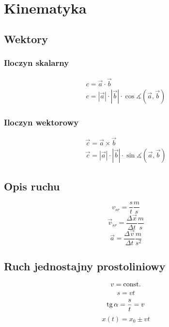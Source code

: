 \chapter{Kinematyka}
  \section{Wektory}
    \subsection{Iloczyn skalarny}
      \begin{gather}
        c = \vec a \cdot \vec b\\
        c = |\vec a|\cdot |\vec b|\cdot\cos\measuredangle(\vec a, \vec b)
      \end{gather}
    \subsection{Iloczyn wektorowy}
      \begin{gather}
        \vec c = \vec a \times \vec b\\
        \vec c = |\vec a|\cdot |\vec b|\cdot\sin\measuredangle(\vec a, \vec b)
      \end{gather}
  \section{Opis ruchu}
    \begin{equation}
      v_{\acute sr} = \frac st \unit{\frac ms}
    \end{equation}
    \begin{equation}
      \vec v_{\acute sr} = \frac{\Delta\vec x}{\Delta t} \unit{\frac ms}
    \end{equation}
    \begin{equation}
      \vec a = \frac{\Delta\vec v}{\Delta t} \unit{\frac{m}{s^2}}
    \end{equation}
  \section{Ruch jednostajny prostoliniowy}
    \begin{equation}
      v = \operatorname{const.}
    \end{equation}
    \begin{equation}
      s = vt
    \end{equation}
    \begin{equation}
      \operatorname{tg}\alpha = \frac st = v
    \end{equation}
    \begin{equation}
      x(t) = x_0 \pm vt
    \end{equation}
